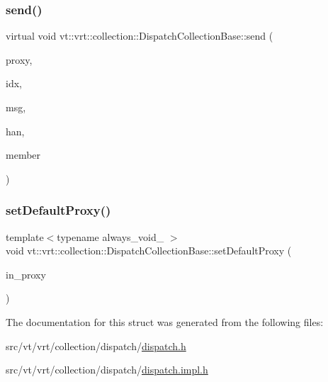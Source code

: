 \subsubsection{\texorpdfstring{send()}{send()}}
{\footnotesize\ttfamily virtual void vt\+::vrt\+::collection\+::\+Dispatch\+Collection\+Base\+::send (\begin{DoxyParamCaption}\item[{\hyperlink{namespacevt_a1b417dd5d684f045bb58a0ede70045ac}{Virtual\+Proxy\+Type}}]{proxy,  }\item[{void $\ast$}]{idx,  }\item[{void $\ast$}]{msg,  }\item[{\hyperlink{namespacevt_af64846b57dfcaf104da3ef6967917573}{Handler\+Type}}]{han,  }\item[{bool}]{member }\end{DoxyParamCaption})\hspace{0.3cm}{\ttfamily [pure virtual]}}

\mbox{\label{structvt_1_1vrt_1_1collection_1_1_dispatch_collection_base_a3c5ad977c57108fdcfcc3c2b443428e3}} 
\subsubsection{\texorpdfstring{set\+Default\+Proxy()}{setDefaultProxy()}}
{\footnotesize\ttfamily template$<$typename always\+\_\+void\+\_\+ $>$ \\
void vt\+::vrt\+::collection\+::\+Dispatch\+Collection\+Base\+::set\+Default\+Proxy (\begin{DoxyParamCaption}\item[{\hyperlink{namespacevt_a1b417dd5d684f045bb58a0ede70045ac}{Virtual\+Proxy\+Type} const \&}]{in\+\_\+proxy }\end{DoxyParamCaption})}



The documentation for this struct was generated from the following files\+:\begin{DoxyCompactItemize}
\item 
src/vt/vrt/collection/dispatch/\hyperlink{vrt_2collection_2dispatch_2dispatch_8h}{dispatch.\+h}\item 
src/vt/vrt/collection/dispatch/\hyperlink{vrt_2collection_2dispatch_2dispatch_8impl_8h}{dispatch.\+impl.\+h}\end{DoxyCompactItemize}
